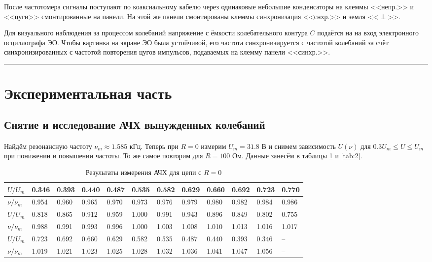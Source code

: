 \documentclass[a4paper,12pt]{article} %
\begin{document}
После частотомера сигналы поступают по коаксиальному кабелю через одинаковые небольшие конденсаторы на клеммы <<непр.>> и <<цуги>> смонтированные на панели. На этой же панели смонтированы клеммы синхронизация <<снхр.>> и земля <<$\perp$>>.

Для визуального наблюдения за процессом колебаний напряжение с ёмкости колебательного контура $C$ подаётся на на вход электронного осциллографа ЭО. Чтобы картинка на экране ЭО была устойчивой, его частота синхронизируется с частотой колебаний за счёт синхронизированных с частотой повторения цугов импульсов, подаваемых на клемму панели <<синхр.>>.

\medskip\hrule\medskip

\section{Экспериментальная часть}

\subsection{Снятие и исследование АЧХ вынужденных колебаний}

\paragraph{} Найдём резонансную частоту $\nu_m \approx 1.585$ кГц. Теперь при $R = 0$ измерим $U_m = 31.8$ В и снимем зависимость $U(\nu)$ для $0.3U_m \leq U \leq U_m$ при понижении и повышении частоты. То же самое повторим для $R = 100$ Ом. Данные занесём в таблицы \ref{tab:1} и \ref{tab:2}.

\begin{table}[h]
\begin{tabularx}{\textwidth}{|X|X|X|X|X|X|X|X|X|X|X|X|}
\hline
$U/U_m$  &   0.346 & 0.393 & 0.440 & 0.487 & 0.535 & 0.582 & 0.629 & 0.660 & 0.692 & 0.723 & 0.770  \\ \hline
$\nu/\nu_m$ & 0.954 & 0.960 & 0.965 & 0.970 & 0.973 & 0.976 & 0.979 & 0.980 & 0.982 & 0.984 & 0.986  \\ \hline
$U/U_m$   &  0.818 & 0.865 & 0.912 & 0.959 & 1.000 & 0.991 & 0.943 & 0.896 & 0.849 & 0.802 & 0.755  \\ \hline
$\nu/\nu_m$  & 0.988 & 0.991 & 0.993 & 0.996 & 1.000 & 1.003 & 1.008 & 1.010 & 1.013 & 1.016 & 1.017  \\ \hline
$U/U_m$   &  0.723 & 0.692 & 0.660 & 0.629 & 0.582 & 0.535 & 0.487 & 0.440 & 0.393 & 0.346  & -- \\ \hline
$\nu/\nu_m$ & 1.019 & 1.021 & 1.023 & 1.025 & 1.028 & 1.032 & 1.036 & 1.041 & 1.047 & 1.056  & -- \\ \hline
\end{tabularx}
\caption{Результаты измерения АЧХ для цепи с $R = 0$}
\label{tab:1}
\end{table}
\end{document}
